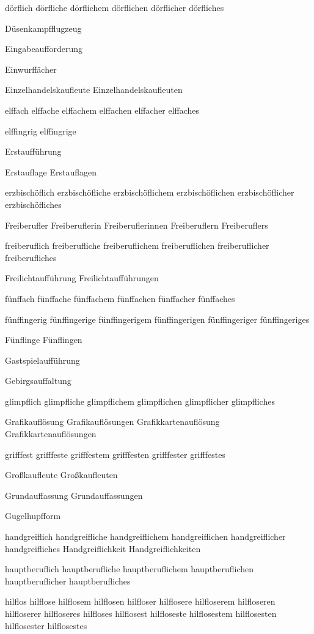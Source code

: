 dörflich dörfliche dörflichem dörflichen dörflicher dörfliches

Düsenkampfflugzeug

Eingabeaufforderung

Einwurffächer

Einzelhandelskaufleute Einzelhandelskaufleuten

elffach elffache elffachem elffachen elffacher elffaches

elffingrig elffingrige

Erstaufführung

Erstauflage
Erstauflagen

erzbischöflich erzbischöfliche erzbischöflichem erzbischöflichen erzbischöflicher erzbischöfliches

Freiberufler Freiberuflerin Freiberuflerinnen Freiberuflern Freiberuflers

freiberuflich freiberufliche freiberuflichem freiberuflichen freiberuflicher freiberufliches

Freilichtaufführung Freilichtaufführungen

fünffach fünffache fünffachem fünffachen fünffacher fünffaches

fünffingerig fünffingerige fünffingerigem fünffingerigen fünffingeriger fünffingeriges

Fünflinge Fünflingen

Gastspielaufführung

Gebirgsauffaltung

glimpflich glimpfliche glimpflichem glimpflichen glimpflicher glimpfliches

Grafikauflösung Grafikauflösungen Grafikkartenauflösung Grafikkartenauflösungen

grifffest grifffeste grifffestem grifffesten grifffester grifffestes

Großkaufleute Großkaufleuten %

Grundauffassung Grundauffassungen

Gugelhupfform

handgreiflich handgreifliche handgreiflichem handgreiflichen handgreiflicher handgreifliches Handgreiflichkeit Handgreiflichkeiten

hauptberuflich hauptberufliche hauptberuflichem hauptberuflichen hauptberuflicher hauptberufliches

hilflos hilflose hilflosem hilflosen hilfloser hilflosere hilfloserem hilfloseren hilfloserer hilfloseres hilfloses hilflosest hilfloseste hilflosestem hilflosesten hilflosester hilflosestes

